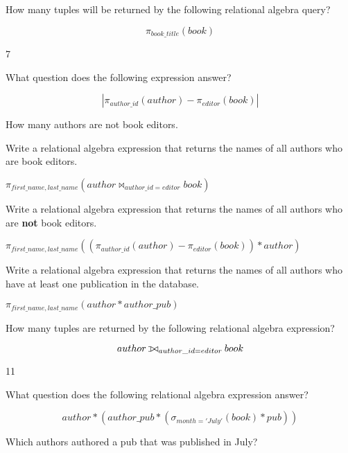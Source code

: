 \documentclass[answers]{exam}
\def\ojoin{\setbox0=\hbox{$\bowtie$}%
  \rule[-.02ex]{.25em}{.4pt}\llap{\rule[\ht0]{.25em}{.4pt}}}
\def\leftouterjoin{\mathbin{\ojoin\mkern-5.8mu\bowtie}}
\begin{document}
\begin{questions}

  \newpage

\question How many tuples will be returned by the following relational algebra query?

\[
\pi_{book\_title}(book)
\]

\begin{solution}[2in]
7
\end{solution}


\question What question does the following expression answer?

\[
|\pi_{author\_id}(author)  -  \pi_{editor}(book)|
\]

\begin{solution}[2in]
How many authors are not book editors.
\end{solution}

\question Write a relational algebra expression that returns the names of all authors who are book editors.

\begin{solution}
$\pi_{first\_name, last\_name}(author \bowtie_{author\_id = editor} book)$
\end{solution}

\newpage

\question Write a relational algebra expression that returns the names of all authors who are {\bf not} book editors.

\begin{solution}[2in]
$\pi_{first\_name, last\_name}((\pi_{author\_id}(author)  -  \pi_{editor}(book)) * author)$
\end{solution}


\question Write a relational algebra expression that returns the names of all authors who have at least one publication in the database.

\begin{solution}[2in]
$\pi_{first\_name, last\_name}(author * author\_pub)$
\end{solution}

\question How many tuples are returned by the following relational algebra expression?

\[
author \leftouterjoin_{author\_id = editor} book
\]

\begin{solution}[2in]
11
\end{solution}

\question What question does the following relational algebra expression answer?

\[
author * (author\_pub * (\sigma_{month = 'July'}(book) * pub))
\]


\begin{solution}
Which authors authored a pub that was published in July?
\end{solution}


\end{questions}
\end{document}
